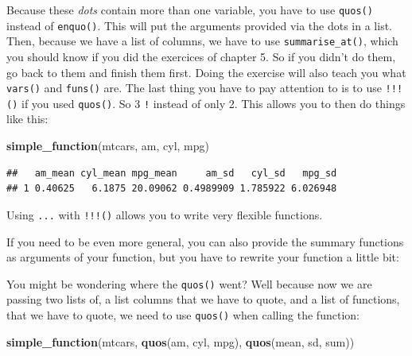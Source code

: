 \documentclass[]{gitbook}
\newenvironment{Shaded}{\begin{snugshade}}{\end{snugshade}}
\newcommand{\ControlFlowTok}[1]{\textcolor[rgb]{0.13,0.29,0.53}{\textbf{#1}}}
\newcommand{\KeywordTok}[1]{\textcolor[rgb]{0.13,0.29,0.53}{\textbf{#1}}}
\newcommand{\NormalTok}[1]{#1}
\newcommand{\OperatorTok}[1]{\textcolor[rgb]{0.81,0.36,0.00}{\textbf{#1}}}
\newcommand{\StringTok}[1]{\textcolor[rgb]{0.31,0.60,0.02}{#1}}
\theoremstyle{definition}
\theoremstyle{definition}
\theoremstyle{definition}
\theoremstyle{remark}
\begin{document}
Because these \emph{dots} contain more than one variable, you have to
use \texttt{quos()} instead of \texttt{enquo()}. This will put the
arguments provided via the dots in a list. Then, because we have a list
of columns, we have to use \texttt{summarise\_at()}, which you should
know if you did the exercices of chapter 5. So if you didn't do them, go
back to them and finish them first. Doing the exercise will also teach
you what \texttt{vars()} and \texttt{funs()} are. The last thing you
have to pay attention to is to use \texttt{!!!()} if you used
\texttt{quos()}. So 3 \texttt{!} instead of only 2. This allows you to
then do things like this:

\begin{Shaded}
\begin{Highlighting}[]
\KeywordTok{simple_function}\NormalTok{(mtcars, am, cyl, mpg)}
\end{Highlighting}
\end{Shaded}

\begin{verbatim}
##   am_mean cyl_mean mpg_mean     am_sd   cyl_sd   mpg_sd
## 1 0.40625   6.1875 20.09062 0.4989909 1.785922 6.026948
\end{verbatim}

Using \texttt{...} with \texttt{!!!()} allows you to write very flexible
functions.

If you need to be even more general, you can also provide the summary
functions as arguments of your function, but you have to rewrite your
function a little bit:

\begin{Shaded}
\end{Shaded}

You might be wondering where the \texttt{quos()} went? Well because now
we are passing two lists of, a list columns that we have to quote, and a
list of functions, that we have to quote, we need to use \texttt{quos()}
when calling the function:

\begin{Shaded}
\begin{Highlighting}[]
\KeywordTok{simple_function}\NormalTok{(mtcars, }\KeywordTok{quos}\NormalTok{(am, cyl, mpg), }\KeywordTok{quos}\NormalTok{(mean, sd, sum))}
\end{Highlighting}
\end{Shaded}
\end{document}
